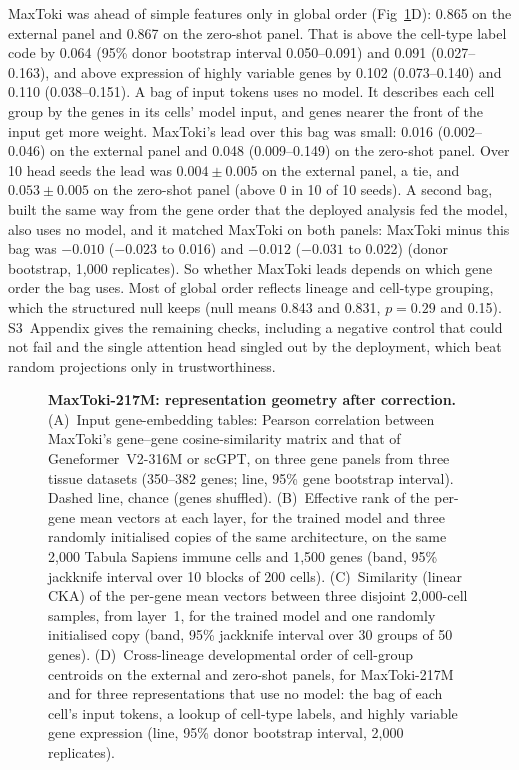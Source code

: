 MaxToki was ahead of simple features only in global order
(Fig~\ref{fig:caseGeom}D): 0.865 on the external panel and 0.867 on the
zero-shot panel. That is above the cell-type label code by 0.064 (95\%
donor bootstrap interval 0.050--0.091) and 0.091 (0.027--0.163), and
above expression of highly variable genes by 0.102 (0.073--0.140) and
0.110 (0.038--0.151). A bag of input tokens uses no model. It describes
each cell group by the genes in its cells' model input, and genes nearer
the front of the input get more weight. MaxToki's lead over this bag was
small: 0.016 (0.002--0.046) on the external panel and 0.048
(0.009--0.149) on the zero-shot panel. Over 10 head seeds the lead was
$0.004 \pm 0.005$ on the external panel, a tie, and $0.053 \pm 0.005$ on
the zero-shot panel (above 0 in 10 of 10 seeds). A second bag, built the
same way from the gene order that the deployed analysis fed the model,
also uses no model, and it matched MaxToki on both panels: MaxToki minus
this bag was $-0.010$ ($-0.023$ to 0.016) and $-0.012$ ($-0.031$ to
0.022) (donor bootstrap, 1,000 replicates). So whether MaxToki leads
depends on which gene order the bag uses. Most of global order
reflects lineage and cell-type grouping, which the structured null keeps
(null means 0.843 and 0.831, $p = 0.29$ and 0.15). S3~Appendix gives the
remaining checks, including a negative control that could not fail and
the single attention head singled out by the deployment, which beat
random projections only in trustworthiness.

\begin{figure}[H]
\caption{\textbf{MaxToki-217M: representation geometry after correction.}
(A)~Input gene-embedding tables: Pearson correlation between MaxToki's
gene--gene cosine-similarity matrix and that of Geneformer~V2-316M or
scGPT, on three gene panels from three tissue datasets (350--382 genes;
line, 95\% gene bootstrap interval). Dashed line, chance (genes
shuffled). (B)~Effective rank of the per-gene mean vectors at each layer,
for the trained model and three randomly initialised copies of the same
architecture, on the same 2,000 Tabula Sapiens immune cells and 1,500
genes (band, 95\% jackknife interval over 10 blocks of 200 cells).
(C)~Similarity (linear CKA) of the per-gene mean vectors between three
disjoint 2,000-cell samples, from layer~1, for the trained model and one
randomly initialised copy (band, 95\% jackknife interval over 30 groups
of 50 genes). (D)~Cross-lineage developmental order of cell-group
centroids on the external and zero-shot panels, for MaxToki-217M and for
three representations that use no model: the bag of each cell's input
tokens, a lookup of cell-type labels, and highly variable gene
expression (line, 95\% donor bootstrap interval, 2,000 replicates).}
\label{fig:caseGeom}
\end{figure}

